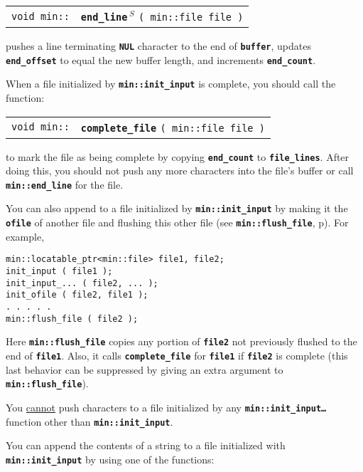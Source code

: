 \documentclass[12pt]{article}
\makeatletter
\newcommand{\TT}[1]{{\tt \bfseries #1}}
\newcommand{\ttindex}[1]{\index{#1@{\tt #1}}}
\newcommand{\pagref}[1]{p\pageref{#1}}
\newcommand{\EOL}{\penalty \exhyphenpenalty}
\newenvironment{indpar}[1][0.3in]%
	{\begin{list}{}%
		     {\setlength{\itemsep}{0in}%
		      \setlength{\topsep}{0in}%
		      \setlength{\parsep}{1ex}%
		      \setlength{\labelwidth}{#1}%
		      \setlength{\leftmargin}{#1}%
		      \addtolength{\leftmargin}{\labelsep}}%
	 \item}%
	{\end{list}}
\newcommand{\LABEL}[1]{\label{#1}}
\newcommand{\MINKEY}[1]%
	   {\TT{#1}\ttindex{min::#1}\ttindex{#1}}
\newcommand{\RESIZE}{$\,^S$}
\makeatother
\begin{document}
\begin{indpar}[1em]\begin{tabular}{r@{}l}
\verb|void min::|
    & \MINKEY{end\_line\RESIZE} \verb|( min::file file )|
\LABEL{MIN::END_LINE_FILE} \\
\end{tabular}\end{indpar}

pushes a line terminating \TT{NUL} character to the end of
\TT{buffer}, updates \TT{end\_\EOL offset} to equal the
new buffer length, and increments \TT{end\_\EOL count}.

When a file initialized by \TT{min::\EOL init\_\EOL input}
is complete, you should call the function:

\begin{indpar}[1em]\begin{tabular}{r@{}l}
\verb|void min::|
    & \MINKEY{complete\_file} \verb|( min::file file )|
\LABEL{MIN::COMPLETE_FILE} \\
\end{tabular}\end{indpar}

to mark the file as being complete by copying \TT{end\_\EOL count}
to \TT{file\_\EOL lines}.  After doing this, you should
not push any more characters into the file's buffer or call
\TT{min::\EOL end\_\EOL line} for the file.

You can also append to a file initialized by \TT{min::\EOL init\_\EOL input}
by making it the \TT{ofile} of another file and flushing this other file
(see \TT{min::\EOL flush\_\EOL file}, \pagref{MIN::FLUSH_FILE}).
For example,
\begin{indpar}\begin{verbatim}
min::locatable_ptr<min::file> file1, file2;
init_input ( file1 );
init_input_... ( file2, ... );
init_ofile ( file2, file1 );
. . . . .
min::flush_file ( file2 );
\end{verbatim}\end{indpar}
Here \TT{min::\EOL flush\_\EOL file} copies any portion of
\TT{file2} not previously flushed to the end of \TT{file1}.
Also, it calls \TT{complete\_file} for \TT{file1} if \TT{file2}
is complete (this last behavior can be suppressed by
giving an extra argument to \TT{min::\EOL flush\_\EOL file}).

You \underline{cannot} push characters to a file initialized by any
\TT{min::\EOL init\_\EOL input\ldots} function other than
\TT{min::\EOL init\_\EOL input}.

You can append the contents of a string to a file initialized
with \TT{min::\EOL init\_\EOL input} by using one of the functions:
\end{document}
